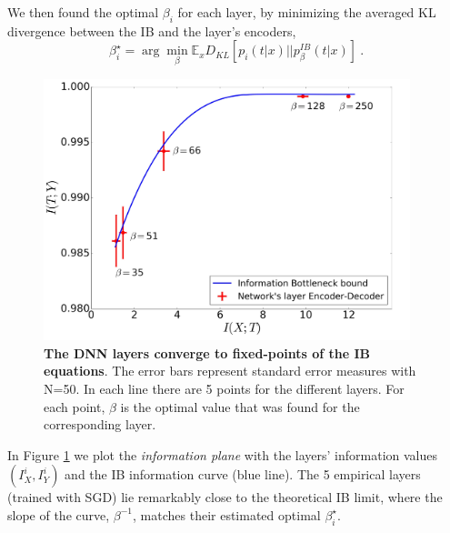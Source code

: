 \documentclass[11pt]{article}
\newcommand\mycomment[1]{} 			     %
\begin{document}
We then found the optimal $\beta_i$ for each layer, by minimizing the averaged KL divergence between the IB and the layer's encoders,
\begin{equation}
\beta_{i}^{\star}=\arg \min_{\beta} \mathbb{E}_{x}  { D_{KL}\left[p_{i}\left(t|x\right)||p_{\beta}^{IB}\left(t|x\right)\right]} ~.
\end{equation}
\begin{figure}[ht]
\centering
\includegraphics[width=0.95\textwidth]{IB.jpg}
\caption{\textbf{\label{IB}
The DNN layers converge to fixed-points of the IB equations}. 
The error bars represent standard error measures with N=50. In each line
there are 5 points for the different layers. For each point, $\beta$
is the optimal value that was found for the corresponding layer.}
\vskip -0.2in
\end{figure}

In Figure \ref{IB} we plot the \textit{information plane} with the layers' information values $\left(I_{X}^{i},I_{Y}^{i}\right)$ and the IB information curve (blue line). The 5 empirical layers (trained with SGD) lie remarkably close to the theoretical IB limit, where the slope of the curve, $\beta^{-1}$, matches their estimated optimal $\beta_{i}^{\star}$.   
\end{document}
